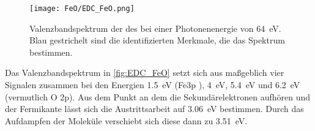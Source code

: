         \begin{figure}
            \centering
            \texttt{[image: FeO/EDC\_FeO.png]}
            \caption{Valenzbandspektrum der des  bei einer Photonenenergie von \SI{64}{\electronvolt}. Blau gestrichelt sind die identifizierten Merkmale, die das Spektrum bestimmen.}
            \label{fig:EDC_FeO}
        \end{figure}
        Das Valenzbandspektrum in \autoref{fig:EDC_FeO} setzt sich aus maßgeblich vier Signalen zusammen bei den Energien \SI{1.5}{\electronvolt} (Fe3p \cite{Grenet et al. - 1980 - On the FeO valence band photoemission spectra.pdf}), \SI{4}{\electronvolt}, \SI{5.4}{\electronvolt} und \SI{6.2}{\electronvolt} (vermutlich O 2p).
        Aus dem Punkt an dem die Sekundärelektronen aufhören und der Fermikante lässt sich die Austrittsarbeit auf \SI{3.06}{\electronvolt} bestimmen.
        Durch das Aufdampfen der Moleküle verschiebt sich diese dann zu \SI{3.51}{\electronvolt}.

